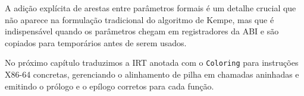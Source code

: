 A adição explícita de arestas entre parâmetros formais é um detalhe
crucial que não aparece na formulação tradicional do algoritmo de Kempe,
mas que é indispensável quando os parâmetros chegam em registradores da
ABI e são copiados para temporários antes de serem usados.

No próximo capítulo traduzimos a IRT anotada com o \texttt{Coloring} para
instruções X86-64 concretas, gerenciando o alinhamento de pilha em
chamadas aninhadas e emitindo o prólogo e o epílogo corretos para cada função.
